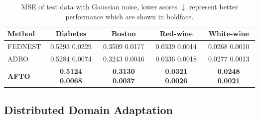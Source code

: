 \documentclass[letterpaper]{article}
\begin{document}
\renewcommand\arraystretch{1}
\renewcommand\tabcolsep{10pt}
\begin{table}[t]
\centering
\renewcommand{\thetable}{\arabic{table}}
{
\begin{adjustbox}{width=0.86\columnwidth}
\begin{tabular}{l|c|c|c|c}
\toprule
 Method   & Diabetes   & Boston  & Red-wine & White-wine   \\ \hline
FEDNEST  &  0.5293  0.0229 & 0.3509  0.0177 &  0.0339  0.0014  & 0.0268  0.0010  \\
ADBO  &  0.5284  0.0074 & 0.3243  0.0046 & 0.0336  0.0018 & 0.0277  0.0013  \\ \hline
\textbf{AFTO} & \textbf{0.5124}  \textbf{0.0068}  & \textbf{0.3130}  \textbf{0.0037} & \textbf{0.0321}  \textbf{0.0026} & \textbf{0.0248}  \textbf{0.0021} \\

\bottomrule
\end{tabular}
\end{adjustbox}}
\caption{MSE of test data with Gaussian noise, lower scores $\downarrow$ represent better performance which are shown in boldface.}
\label{tab:ADBO-ATOP}
\end{table}



\subsection{Distributed Domain Adaptation}
\end{document}
